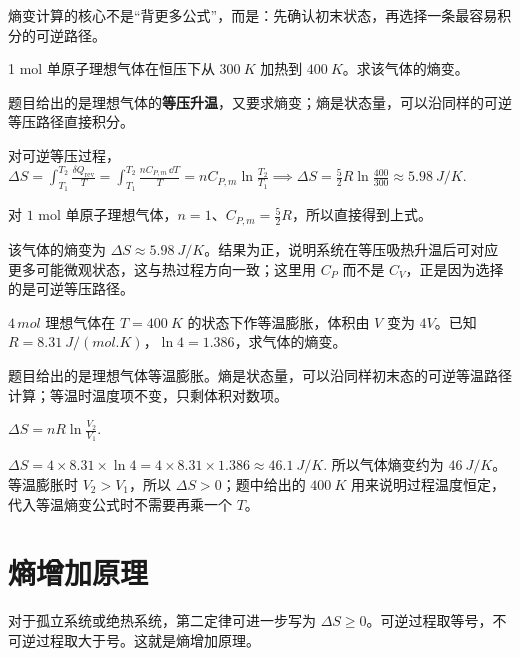 \documentclass[lang=cn,11pt]{elegantbook}
\newcommand{\bridge}[1]{\begin{note}#1\end{note}}
\begin{document}
\bridge{熵变计算的核心不是“背更多公式”，而是：先确认初末状态，再选择一条最容易积分的可逆路径。}

\begin{exercise}[等压升温的熵变]
1 mol 单原子理想气体在恒压下从 \(\SI{300}{K}\) 加热到 \(\SI{400}{K}\)。求该气体的熵变。
\end{exercise}

\begin{solution}
题目给出的是理想气体的\textbf{等压升温}，又要求熵变；熵是状态量，可以沿同样的可逆等压路径直接积分。

对可逆等压过程，
 \(\Delta S=\int_{T_1}^{T_2}\frac{\delta Q_{\mathrm{rev}}}{T} =\int_{T_1}^{T_2}\frac{nC_{P,m}\,\dd T}{T} =nC_{P,m}\ln\frac{T_2}{T_1} \implies \Delta S=\frac{5}{2}R\ln\frac{400}{300}\approx \SI{5.98}{J/K}.\) 

对 \(1\) mol 单原子理想气体，\(n=1\)、\(C_{P,m}=\frac{5}{2}R\)，所以直接得到上式。

该气体的熵变为 \(\Delta S\approx \SI{5.98}{J/K}\)。结果为正，说明系统在等压吸热升温后可对应更多可能微观状态，这与热过程方向一致；这里用 \(C_P\) 而不是 \(C_V\)，正是因为选择的是可逆等压路径。
\end{solution}

\begin{exercise}
\(4\,\si{mol}\) 理想气体在 \(T=\SI{400}{K}\) 的状态下作等温膨胀，体积由 \(V\) 变为 \(4V\)。已知 \(R=\SI{8.31}{J/(mol.K)}\)，\(\ln4=1.386\)，求气体的熵变。
\end{exercise}

\begin{solution}
题目给出的是理想气体等温膨胀。熵是状态量，可以沿同样初末态的可逆等温路径计算；等温时温度项不变，只剩体积对数项。

 \(\Delta S=nR\ln\frac{V_2}{V_1}.\) 


 \(\Delta S =4\times 8.31\times \ln4 =4\times 8.31\times 1.386 \approx \SI{46.1}{J/K}.\) 
所以气体熵变约为 \(\SI{46}{J/K}\)。等温膨胀时 \(V_2>V_1\)，所以 \(\Delta S>0\)；题中给出的 \(\SI{400}{K}\) 用来说明过程温度恒定，代入等温熵变公式时不需要再乘一个 \(T\)。
\end{solution}

\section{熵增加原理}

对于孤立系统或绝热系统，第二定律可进一步写为 \(\Delta S\ge 0\)。可逆过程取等号，不可逆过程取大于号。这就是熵增加原理。
\end{document}
